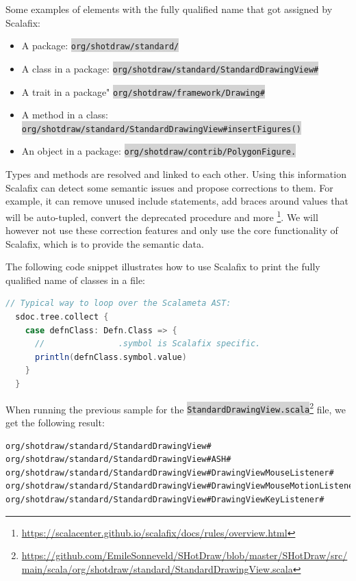 \documentclass[onecolumn]{article}
\newcommand{\code}[1]{\colorbox{lightgray}{\texttt{#1}}}
\begin{document}
Some examples of elements with the fully qualified name that got assigned by Scalafix:
\begin{itemize}
    \item A package: \code{org/shotdraw/standard/}
    \item A class in a package: \code{org/shotdraw/standard/StandardDrawingView\#}
    \item A trait in a package" \code{org/shotdraw/framework/Drawing\#}
    \item A method in a class: \code{org/shotdraw/standard/StandardDrawingView\#insertFigures()}
    \item An object in a package: \code{org/shotdraw/contrib/PolygonFigure.}
\end{itemize}

Types and methods are resolved and linked to each other. Using this information Scalafix can detect some semantic issues and propose corrections to them. For example, it can remove unused include statements, add braces around values that will be auto-tupled, convert the deprecated procedure and more \footnote{\url{https://scalacenter.github.io/scalafix/docs/rules/overview.html}}. We will however not use these correction features and only use the core functionality of Scalafix, which is to provide the semantic data.

The following code snippet illustrates how to use Scalafix to print the fully qualified name of classes in a file:
\begin{lstlisting}[language=scala]
  // Typical way to loop over the Scalameta AST:
  sdoc.tree.collect { 
    case defnClass: Defn.Class => {
      //               .symbol is Scalafix specific.
      println(defnClass.symbol.value)
    }
  }
\end{lstlisting}
When running the previous sample for the \code{StandardDrawingView.scala}\footnote{\url{https://github.com/EmileSonneveld/SHotDraw/blob/master/SHotDraw/src/main/scala/org/shotdraw/standard/StandardDrawingView.scala}} file, we get the following result: 
\begin{lstlisting}[language={}, basicstyle=\ttfamily\small]
org/shotdraw/standard/StandardDrawingView#
org/shotdraw/standard/StandardDrawingView#ASH#
org/shotdraw/standard/StandardDrawingView#DrawingViewMouseListener#
org/shotdraw/standard/StandardDrawingView#DrawingViewMouseMotionListener#
org/shotdraw/standard/StandardDrawingView#DrawingViewKeyListener#
\end{lstlisting}
\end{document}
